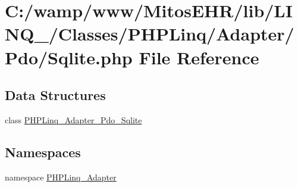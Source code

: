 \hypertarget{_sqlite_8php}{\section{\-C\-:/wamp/www/\-Mitos\-E\-H\-R/lib/\-L\-I\-N\-Q\-\_/\-Classes/\-P\-H\-P\-Linq/\-Adapter/\-Pdo/\-Sqlite.php \-File \-Reference}
\label{_sqlite_8php}
}
\subsection*{\-Data \-Structures}
\begin{DoxyCompactItemize}
\item 
class \hyperlink{class_p_h_p_linq___adapter___pdo___sqlite}{\-P\-H\-P\-Linq\-\_\-\-Adapter\-\_\-\-Pdo\-\_\-\-Sqlite}
\end{DoxyCompactItemize}
\subsection*{\-Namespaces}
\begin{DoxyCompactItemize}
\item 
namespace \hyperlink{namespace_p_h_p_linq___adapter}{\-P\-H\-P\-Linq\-\_\-\-Adapter}
\end{DoxyCompactItemize}
